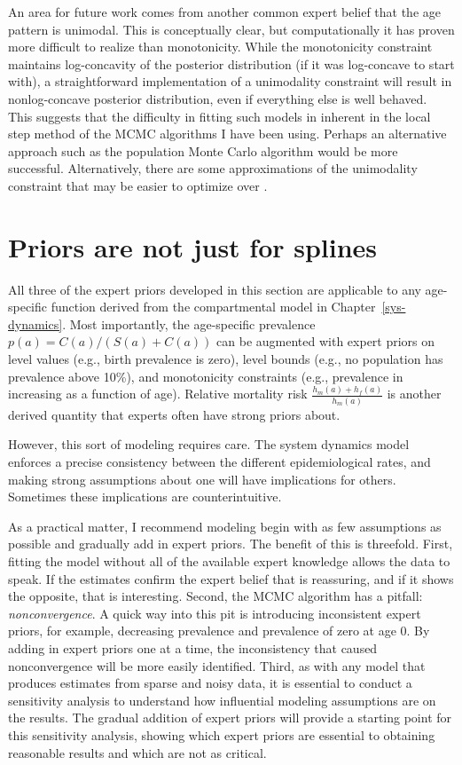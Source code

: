 An area for future work comes from another common expert belief that
the age pattern is unimodal.  This is conceptually clear, but
computationally it has proven more difficult to realize than
monotonicity.  While the monotonicity constraint maintains
log-concavity of the posterior distribution (if it was log-concave to
start with), a straightforward implementation of a unimodality
constraint will result in nonlog-concave posterior distribution, even
if everything else is well behaved.  This suggests that the difficulty
in fitting such models in inherent in the local step method of the
MCMC algorithms I have been using.  Perhaps an alternative approach
such as the population Monte Carlo algorithm would be more successful.
Alternatively, there are some approximations of the unimodality
constraint that may be easier to optimize over \cite{papp_shape_2012}.

\section{Priors are not just for splines}
All three of the expert priors developed in this section are
applicable to any age-specific function derived from the compartmental
model in Chapter~\ref{sys-dynamics}. Most importantly, the
age-specific prevalence $p(a) = C(a)/(S(a)+C(a))$ can be augmented with expert
priors on level values (e.g., birth prevalence is zero), level bounds
(e.g., no population has prevalence above 10\%), and monotonicity
constraints (e.g., prevalence in increasing as a function of
age). Relative mortality risk $\frac{h_m(a)+h_f(a)}{h_m(a)}$ is another derived quantity that
experts often have strong priors about.

However, this sort of modeling requires care. The system dynamics
model enforces a precise consistency between the different
epidemiological rates, and making strong assumptions about one will
have implications for others.  Sometimes these implications are
counterintuitive.

As a practical matter, I recommend modeling begin with as few
assumptions as possible and gradually add in expert priors. The
benefit of this is threefold.  First, fitting the model without all of
the available expert knowledge allows the data to speak.  If the estimates
confirm the expert belief that is reassuring, and if it shows the
opposite, that is interesting. Second, the MCMC algorithm has a
pitfall: \emph{nonconvergence}. A quick way into this pit is
introducing inconsistent expert priors, for example, decreasing
prevalence and prevalence of zero at age $0$. By adding in expert
priors one at a time, the inconsistency that caused nonconvergence
will be more easily identified. Third, as with any model that produces
estimates from sparse and noisy data, it is essential to conduct a
sensitivity analysis to understand how influential modeling
assumptions are on the results.  The gradual addition of expert priors
will provide a starting point for this sensitivity analysis, showing
which expert priors are essential to obtaining reasonable results and
which are not as critical.

